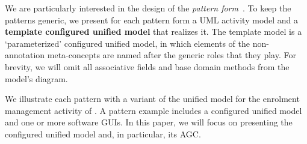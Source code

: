 We are particularly interested in the design of the \textit{pattern form}~\cite{riehle_understanding_1996, gamma_design_1994}. To keep the patterns generic, we present for each pattern form a UML activity model and a \textbf{template configured unified model} that realizes it. The template model is a `parameterized' configured unified model, in which elements of the non-annotation meta-concepts are named after the generic roles that they play. 
%
For brevity, we will omit all associative fields and base domain methods from the model's diagram.

We illustrate each pattern with a variant of the unified model for the enrolment management activity of \courseman. A pattern example includes a configured unified model and one or more software GUIs. In this paper, we will focus on presenting the configured unified model and, in particular, its AGC. 


